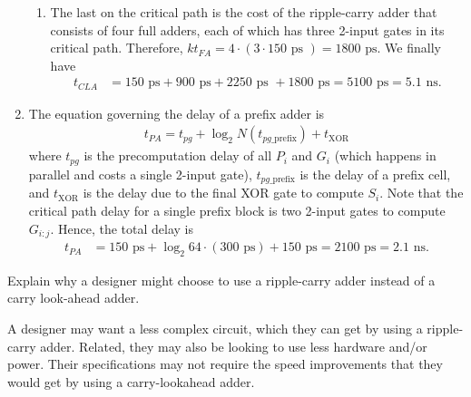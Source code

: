 \documentclass[12pt]{article}
\newenvironment{ex}[2][Exercise]{\begin{trivlist}
		\item[\hskip \labelsep {\bfseries #1}\hskip \labelsep {\bfseries #2.}]}{\end{trivlist}}
\newenvironment{sol}[1][Solution]{\begin{trivlist}
		\item[\hskip \labelsep {\bfseries #1:}]}{\end{trivlist}}
\begin{document}
\begin{sol}
\begin{enumerate}[label=(\alph*)]
\begin{enumerate}[label=(\roman*)]
			\item The last on the critical path is the cost of the ripple-carry adder
			that consists of four full adders, each of which has three 2-input gates in its
			critical path. Therefore, $kt_{FA}=4\cdot (3\cdot 150 \text{ ps })=1800\text{ ps}$.
			We finally have
			\begin{align*}
				t_{CLA}&=150\text{ ps} + 900\text{ ps} + 2250\text{ ps } + 1800\text{ ps}=5100\text{ ps}=
				5.1\text{ ns}.
			\end{align*}
		\end{enumerate}
		\item The equation governing the delay of a prefix adder is
		\begin{align*}
			t_{PA}=t_{pg}+\log_2N(t_{pg\_\text{prefix}})+t_{\text{XOR}}
		\end{align*}
		where $t_{pg}$ is the precomputation delay of all $P_i$ and $G_i$ (which happens in parallel and
		costs a single 2-input gate), $t_{pg\_\text{prefix}}$ is the delay of a prefix cell,
		and $t_{\text{XOR}}$ is the delay due to the final XOR gate to compute $S_i$.
		Note that the critical path delay for a single prefix block is two 2-input gates
		to compute $G_{i:j}$. Hence, the total delay is
		\begin{align*}
			t_{PA}&=150\text{ ps} + \log_2 64\cdot (300\text{ ps})+150\text{ ps}=2100\text{ ps}=2.1\text{ ns}.
		\end{align*}
	\end{enumerate}
\end{sol}
                                               
\begin{ex}{5.3}
	Explain why a designer might choose to use a ripple-carry adder instead
	of a carry look-ahead adder.
\end{ex}

\begin{sol}
	A designer may want a less complex circuit, which they can get by using a ripple-carry
	adder. Related, they may also be looking to use less hardware and/or power. Their
	specifications may not require the speed improvements that they would get by
	using a carry-lookahead adder.
\end{sol}

\begin{sol}
\end{sol}
\end{document}
